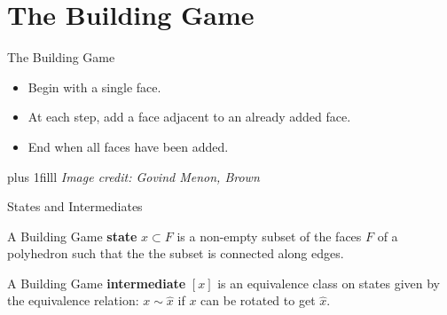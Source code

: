 \documentclass{beamer}
\newcommand{\btVFill}{\vskip0pt plus 1filll}
\begin{document}
\section{The Building Game}
\begin{frame}{The Building Game}
%
\begin{itemize}
  \item Begin with a single face.
  \item At each step, add a face adjacent to an already added face.
  \item End when all faces have been added.
\end{itemize}
\btVFill
\textit{\scriptsize Image credit: Govind Menon, Brown} 

\end{frame}
\begin{frame}{States and Intermediates}
\begin{definition}
  A Building Game \textbf{state} $x \subset F$ is a non-empty subset of the faces $F$ of a polyhedron such that the the subset is connected along edges. 
\end{definition} 
\begin{definition}
A Building Game \textbf{intermediate} $[x]$ is an equivalence class on states given by the equivalence relation: $x \sim \hat{x}$ if $x$ can be rotated to get $\hat{x}$.
\end{definition}

\end{frame}
\end{document}

